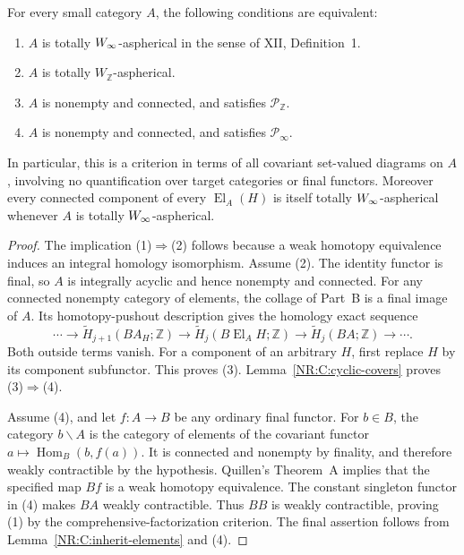 \begin{nrtheorem}\label{NR:C:classification}
For every small category $A$, the following conditions are equivalent:
\begin{enumerate}
\item $A$ is totally $W_\infty$-aspherical in the sense of XII, Definition~1.
\item $A$ is totally $W_{\mathbb Z}$-aspherical.
\item $A$ is nonempty and connected, and satisfies $\mathcal P_{\mathbb Z}$.
\item $A$ is nonempty and connected, and satisfies $\mathcal P_\infty$.
\end{enumerate}
In particular, this is a criterion in terms of all covariant set-valued diagrams on $A$, involving no quantification over target categories or final functors. Moreover every connected component of every $\operatorname{El}_A(H)$ is itself totally $W_\infty$-aspherical whenever $A$ is totally $W_\infty$-aspherical.
\end{nrtheorem}
\begin{proof}
The implication (1)$\Rightarrow$(2) follows because a weak homotopy equivalence induces an integral homology isomorphism. Assume (2). The identity functor is final, so $A$ is integrally acyclic and hence nonempty and connected. For any connected nonempty category of elements, the collage of Part~B is a final image of $A$. Its homotopy-pushout description gives the homology exact sequence
\[
 \cdots\to\widetilde H_{j+1}(BA_H;\mathbb Z)
 \to\widetilde H_j(B\operatorname{El}_A H;\mathbb Z)
 \to\widetilde H_j(BA;\mathbb Z)\to\cdots.
\]
Both outside terms vanish. For a component of an arbitrary $H$, first replace $H$ by its component subfunctor. This proves (3). Lemma~\ref{NR:C:cyclic-covers} proves (3)$\Rightarrow$(4).

Assume (4), and let $f:A\to B$ be any ordinary final functor. For $b\in B$, the category $b\backslash A$ is the category of elements of the covariant functor $a\mapsto\operatorname{Hom}_B(b,f(a))$. It is connected and nonempty by finality, and therefore weakly contractible by the hypothesis. Quillen's Theorem~A \citep[Section~1, Theorem~A]{Quillen1973} implies that the specified map $Bf$ is a weak homotopy equivalence. The constant singleton functor in (4) makes $BA$ weakly contractible. Thus $BB$ is weakly contractible, proving (1) by the comprehensive-factorization criterion. The final assertion follows from Lemma~\ref{NR:C:inherit-elements} and (4).
\end{proof}

